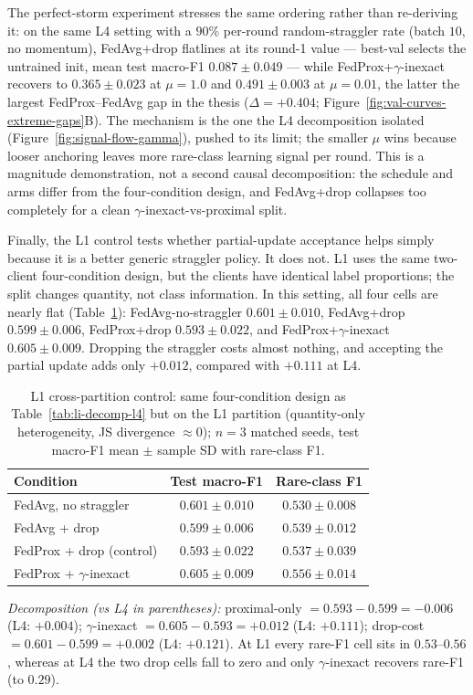 \documentclass[11pt,a4paper]{report}
\begin{document}
The perfect-storm experiment stresses the same ordering rather than re-deriving
it: on the same L4 setting with a $90\%$ per-round random-straggler rate (batch
$10$, no momentum), FedAvg+drop flatlines at its round-1 value --- best-val
selects the untrained init, mean test macro-F1 $0.087 \pm 0.049$ --- while
FedProx+$\gamma$-inexact recovers to $0.365 \pm 0.023$ at $\mu = 1.0$ and
$0.491 \pm 0.003$ at $\mu = 0.01$, the latter the largest FedProx--FedAvg gap in
the thesis ($\Delta = +0.404$; Figure~\ref{fig:val-curves-extreme-gaps}B). The
mechanism is the one the L4 decomposition isolated (Figure~\ref{fig:signal-flow-gamma}),
pushed to its limit; the smaller $\mu$ wins because looser anchoring leaves more
rare-class learning signal per round. This is a magnitude demonstration, not a
second causal decomposition: the schedule and arms differ from the four-condition
design, and FedAvg+drop collapses too completely for a clean
$\gamma$-inexact-vs-proximal split.

Finally, the L1 control tests whether partial-update acceptance helps simply
because it is a better generic straggler policy. It does not. L1 uses the
same two-client four-condition design, but the clients have identical label
proportions; the split changes quantity, not class information. In this
setting, all four cells are nearly flat (Table~\ref{tab:li-decomp-l1}):
FedAvg-no-straggler $0.601 \pm 0.010$, FedAvg+drop $0.599 \pm 0.006$,
FedProx+drop $0.593 \pm 0.022$, and FedProx+$\gamma$-inexact
$0.605 \pm 0.009$. Dropping the straggler costs almost nothing, and accepting
the partial update adds only $+0.012$, compared with $+0.111$ at L4.

\begin{table}[H]
\centering
\caption{L1 cross-partition control: same four-condition design as
Table~\ref{tab:li-decomp-l4} but on the L1 partition (quantity-only
heterogeneity, JS divergence $\approx 0$); $n=3$ matched seeds, test
macro-F1 mean $\pm$ sample SD with rare-class F1.}
\label{tab:li-decomp-l1}
\small
\begin{tabular}{lcc}
\toprule
Condition                                       & Test macro-F1        & Rare-class F1 \\
\midrule
FedAvg, no straggler                            & $0.601 \pm 0.010$    & $0.530 \pm 0.008$ \\
FedAvg + drop                                   & $0.599 \pm 0.006$    & $0.539 \pm 0.012$ \\
FedProx + drop (control)                        & $0.593 \pm 0.022$    & $0.537 \pm 0.039$ \\
FedProx + $\gamma$-inexact                      & $0.605 \pm 0.009$    & $0.556 \pm 0.014$ \\
\bottomrule
\end{tabular}

\smallskip
\noindent\textit{Decomposition (vs L4 in parentheses):}
proximal-only $= 0.593 - 0.599 = -0.006$ (L4: $+0.004$);
$\gamma$-inexact $= 0.605 - 0.593 = +0.012$ (L4: $+0.111$);
drop-cost $= 0.601 - 0.599 = +0.002$ (L4: $+0.121$). At L1 every rare-F1
cell sits in $0.53$--$0.56$, whereas at L4 the two drop cells fall to zero
and only $\gamma$-inexact recovers rare-F1 (to $0.29$).
\end{table}
\end{document}
